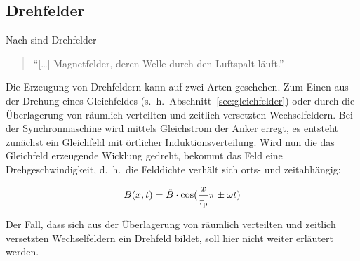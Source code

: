 \subsection{Drehfelder}\label{sec:drehfelder}

Nach \textcite{hofmann2013} sind Drehfelder

\begin{quote}
\enquote{[\ldots]  Magnetfelder, deren Welle durch den Luftspalt läuft.}
\end{quote}

Die Erzeugung von Drehfeldern kann auf zwei Arten geschehen.
Zum Einen aus der Drehung eines Gleichfeldes (s.~h.~Abschnitt~\ref{sec:gleichfelder}) oder durch die Überlagerung von räumlich verteilten und zeitlich versetzten Wechselfeldern.
Bei der Synchronmaschine wird mittels Gleichstrom der Anker erregt, es entsteht zunächst ein Gleichfeld mit örtlicher Induktionsverteilung.
Wird nun die das Gleichfeld erzeugende Wicklung gedreht, bekommt das Feld eine Drehgeschwindigkeit, d.\ h.\ die Felddichte verhält sich orts- und zeitabhängig:

\begin{align}
B(x,t) = \hat{B}\cdot\cos(\frac{x}{\tau_{\mathrm{p}}}\pi\pm\omega t)
\end{align}

Der Fall, dass sich aus der Überlagerung von räumlich verteilten und zeitlich versetzten Wechselfeldern ein Drehfeld bildet, soll hier nicht weiter erläutert werden.




